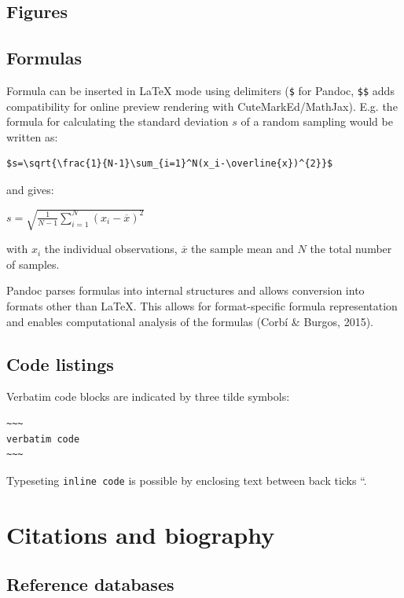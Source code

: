 \documentclass[10pt,fleqn]{wlpeerj}
\begin{document}
\subsection{Figures}\label{figures}

\subsection{Formulas}\label{formulas}

Formula
can
be
inserted
in
LaTeX
mode
using
delimiters
(\texttt{\$}
for
Pandoc,
\texttt{\$\$}
adds
compatibility
for
online
preview
rendering
with
CuteMarkEd/MathJax).
E.g.
the
formula
for
calculating
the
standard
deviation
\(s\)
of a
random
sampling
would
be
written
as:

\begin{verbatim}
$s=\sqrt{\frac{1}{N-1}\sum_{i=1}^N(x_i-\overline{x})^{2}}$
\end{verbatim}

and
gives:

\(s=\sqrt{\frac{1}{N-1}\sum_{i=1}^N(x_i-\overline{x})^{2}}\)

with
\(x_i\)
the
individual
observations,
\(\overline{x}\)
the
sample
mean
and
\(N\)
the
total
number
of
samples.

Pandoc
parses
formulas
into
internal
structures
and
allows
conversion
into
formats
other
than
LaTeX.
This
allows
for
format-specific
formula
representation
and
enables
computational
analysis
of
the
formulas
(Corbí
\&
Burgos,
2015).

\subsection{Code
listings}\label{code-listings}

Verbatim
code
blocks
are
indicated
by
three
tilde
symbols:

\begin{verbatim}
~~~
verbatim code
~~~
\end{verbatim}

Typeseting
\texttt{inline\ code}
is
possible
by
enclosing
text
between
back
ticks
``.

\section{Citations
and
biography}\label{citations-and-biography}

\subsection{Reference
databases}\label{reference-databases}
\end{document}
